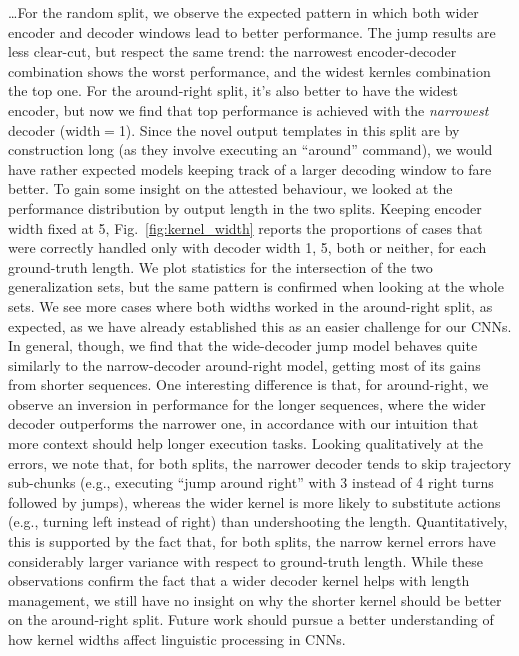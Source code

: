 \ldots For the random split, we observe the expected pattern in which
both wider encoder and decoder windows lead to better performance. The
jump results are less clear-cut, but respect the same trend: the
narrowest encoder-decoder combination shows the worst performance, and
the widest kernles combination the top one. For the around-right
split, it's also better to have the widest encoder, but now we find
that top performance is achieved with the \emph{narrowest} decoder
(width$=$1). Since the novel output templates in this split are by
construction long (as they involve executing an ``around'' command),
we would have rather expected models keeping track of a larger
decoding window to fare better. To gain some insight on the attested
behaviour, we looked at the performance distribution by output length
in the two splits. Keeping encoder width fixed at 5,
Fig.~\ref{fig:kernel_width} reports the proportions of cases that were
correctly handled only with decoder width 1, 5, both or neither, for
each ground-truth length. We plot statistics for the intersection of
the two generalization sets, but the same pattern is confirmed when
looking at the whole sets. We see more cases where both widths worked
in the around-right split, as expected, as we have already established
this as an easier challenge for our CNNs. In general, though, we find
that the wide-decoder jump model behaves quite similarly to the
narrow-decoder around-right model, getting most of its gains from
shorter sequences. One interesting difference is that, for
around-right, we observe an inversion in performance for the longer
sequences, where the wider decoder outperforms the narrower one, in
accordance with our intuition that more context should help longer
execution tasks. Looking qualitatively at the errors, we note that,
for both splits, the narrower decoder tends to skip trajectory
sub-chunks (e.g., executing ``jump around right'' with 3 instead of 4
right turns followed by jumps), whereas the wider kernel is more
likely to substitute actions (e.g., turning left instead of right) than
undershooting the length. Quantitatively, this is supported by the
fact that, for both splits, the narrow kernel errors have considerably
larger variance with respect to ground-truth length. While these
observations confirm the fact that a wider decoder kernel helps
with length management, we still have no insight on why the shorter
kernel should be better on the around-right split. Future work should
pursue a better understanding of how kernel widths affect linguistic
processing in CNNs.

